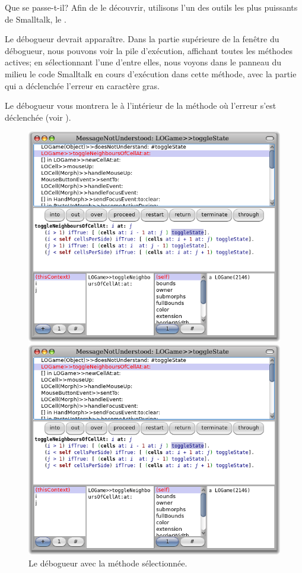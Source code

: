 \documentclass[a4paper,10pt,twoside]{book}
\begin{document}
\noindent
Que se passe-t-il? Afin de le découvrir, utilisons l'un des outils les plus puissants de Smalltalk, le .

Le débogueur devrait apparaître.
Dans la partie supérieure de la fen\^etre du débogueur, nous pouvons
voir la pile d'exécution, affichant toutes les méthodes actives; en
sélectionnant l'une d'entre elles, nous voyons dans le panneau du
milieu le code Smalltalk en cours d'exécution dans cette méthode, avec
la partie qui a déclenchée l'erreur en caractère gras.

Le débogueur vous montrera le  à l'intérieur
de la méthode o\`u l'erreur s'est déclenchée (voir ).

\begin{figure}[ht]
\ifluluelse
	{\centerline {\includegraphics[width=\textwidth]{Debugger}}}
	{\centerline {\includegraphics[scale=0.7]{Debugger}}}
\caption{Le débogueur avec la méthode  sélectionnée.
\label{fig:debugToggle}}
\end{figure}
\end{document}
